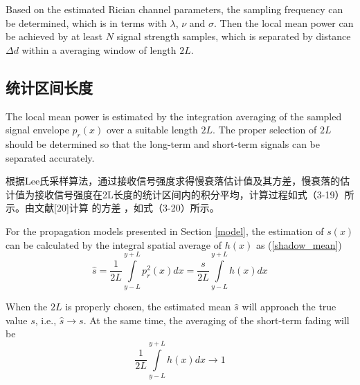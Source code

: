 Based on the estimated Rician channel parameters, the sampling frequency can be determined, which is in terms with $\lambda$, $\nu$ and $\sigma$. Then the local mean power can be achieved by at least $N$ signal strength samples, which is separated by distance $\Delta d$ within a averaging window of length $2L$.

\subsection{统计区间长度}
\label{sec:length}

The local mean power is estimated by the integration averaging of the sampled signal envelope $p_r(x)$ over a suitable length $2L$. The proper selection of $2L$ should be determined so that the long-term and short-term signals can be separated accurately.

根据Lee氏采样算法，通过接收信号强度求得慢衰落估计值及其方差，慢衰落的估计值为接收信号强度在2L长度的统计区间内的积分平均，计算过程如式（3-19）所示。由文献[20]计算 的方差 ，如式（3-20）所示。

For the propagation models presented in Section \ref{model}, the estimation of $s(x)$ can be calculated by the integral spatial average of $h(x)$ as (\ref{shadow_mean})
\begin{equation}
    \hat{s}=\frac{1}{2L}\int\limits_{y-L}^{y+L} p_r^2(x)dx=\frac{s}{2L}\int\limits_{y-L}^{y+L} h(x)dx
\label{shadow_mean}
\end{equation}

When the $2L$ is properly chosen, the estimated mean $\hat{s}$ will approach the true value $s$, i.e., $\hat{s}\rightarrow s$. At the same time, the averaging of the short-term fading will be
\begin{equation}
\frac{1}{2L}\int\limits_{y-L}^{y+L} h(x)dx \rightarrow 1
\label{short-term}
\end{equation}

